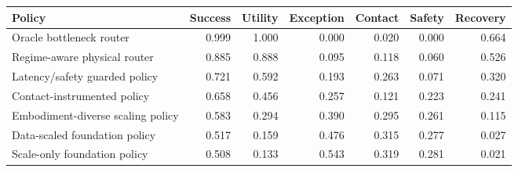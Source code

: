 \begin{tabular}{lrrrrrr}
\toprule
Policy & Success & Utility & Exception & Contact & Safety & Recovery \\
\midrule
Oracle bottleneck router & 0.999 & 1.000 & 0.000 & 0.020 & 0.000 & 0.664 \\
Regime-aware physical router & 0.885 & 0.888 & 0.095 & 0.118 & 0.060 & 0.526 \\
Latency/safety guarded policy & 0.721 & 0.592 & 0.193 & 0.263 & 0.071 & 0.320 \\
Contact-instrumented policy & 0.658 & 0.456 & 0.257 & 0.121 & 0.223 & 0.241 \\
Embodiment-diverse scaling policy & 0.583 & 0.294 & 0.390 & 0.295 & 0.261 & 0.115 \\
Data-scaled foundation policy & 0.517 & 0.159 & 0.476 & 0.315 & 0.277 & 0.027 \\
Scale-only foundation policy & 0.508 & 0.133 & 0.543 & 0.319 & 0.281 & 0.021 \\
\bottomrule
\end{tabular}
